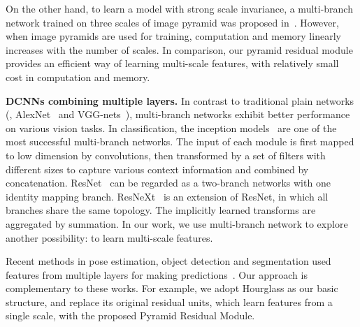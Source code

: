 \documentclass[10pt,twocolumn,letterpaper]{article}
\newcommand{\smalltitle}[1]{\vspace{0.2em}\noindent \textbf{{#1}}}
\begin{document}
On the other hand, to learn a model with strong scale invariance, a multi-branch network trained on three scales of image pyramid was proposed in~\cite{tompson2015efficient}. However, when image pyramids are used for training,  computation and memory linearly increases with the number of scales. In comparison, our pyramid residual module provides an efficient way of learning multi-scale features, with relatively small cost in computation and memory.





\smalltitle{DCNNs combining multiple layers. }
In contrast to traditional plain networks (\eg, AlexNet~\cite{krizhevsky2012imagenet} and VGG-nets~\cite{simonyan2014very}), multi-branch networks exhibit better performance on various vision tasks. 
In classification, the inception models~\cite{szegedy2015going,ioffe2015batch,szegedy2016rethinking,szegedy2016inception} are one of the most successful multi-branch networks. 
The input of each module is first mapped to low dimension by  convolutions, then transformed by a set of filters with different sizes to capture various context information and combined by concatenation. 
ResNet~\cite{he2016deep,he2016identity} can be regarded as a two-branch networks with one identity mapping branch. 
ResNeXt~\cite{xie2016aggregated} is an extension of ResNet, in which all branches share the same topology. The implicitly learned transforms are aggregated by summation. In our work, we use multi-branch network to explore another possibility: to learn multi-scale features. 

Recent methods in pose estimation, object detection and segmentation used features from multiple layers for making predictions~\cite{liu2016ssd,cai2016unified, hariharan2015hypercolumns,bell2016inside,newell2016stacked,chen2016deeplab}. Our approach is complementary to these works. 
For example, we adopt Hourglass as our basic structure, and replace its original residual units, which learn features from a single scale, with the proposed Pyramid Residual Module. 



																																				 
\end{document}
